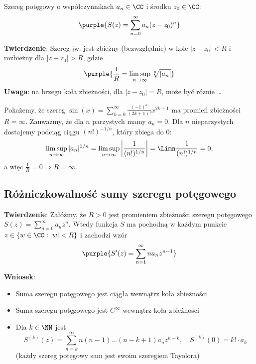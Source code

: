 Szereg potęgowy o współczynnikach $a_n\in\CC$ i środku $z_0\in\CC$:
$$\purple{S(z)=\sum_{n=0}^\infty a_n(z-z_0)^n}$$

\textbf{Twierdzenie}:
Szereg jw. jest zbieżny (bezwzględnie) w kole $|z-z_0|<R$ i rozbieżny dla $|z-z_0|>R$, gdzie
$$\purple{\frac{1}{R}=\limsup_{n\to\infty}\sqrt[n]{|a_n|}}$$
\textbf{Uwaga}: na brzegu koła zbieżności, dla $|z-z_0|=R$, może być różnie \ldots

\begin{example}
    Pokażemy, że szereg $\sin(x)=\sum_{k=0}^\infty\frac{(-1)^k}{(2k+1)!}x^{2k+1}$ ma promień zbieżności $R=\infty$. Zauważmy, że dla $n$ parzystych mamy $a_n=0$. Dla $n$ nieparzystych dostajemy podciąg ciągu $(n!)^{-1/n}$, który zbiega do 0:
    $$
    \limsup_{n\to\infty}|a_n|^{1/n} = \limsup_{n\to\infty}\left|\frac{1}{(n!)^{1/n}}\right| = \Limn\frac{1}{(n!)^{1/n}} = 0,
    $$
    a więc $\frac{1}{R}=0 \Rightarrow R = \infty$.
\end{example}

\subsection{Różniczkowalność sumy szeregu potęgowego}
\textbf{Twierdzenie}:
Załóżmy, że $R>0$ jest promieniem zbieżności szeregu potęgowego $S(z)=\sum_{n=0}^\infty a_nz^n$. Wtedy funkcja $S$ ma pochodną w każdym punkcie $z\in\{w\in\CC:|w|<R\}$ i zachodzi wzór
$$\purple{S'(z)=\sum_{n=1}^\infty na_nz^{n-1}}$$

\textbf{Wniosek}:
\begin{itemize}
    \item Suma szeregu potęgowego jest ciągła wewnątrz koła zbieżności
    \item Suma szeregu potęgowego jest $C^\infty$ wewnątrz koła zbieżności
    \item Dla $k\in\NN$ jest $$S^{(k)}(z)=\sum_{n=k}^\infty n(n-1)\ldots(n-k+1)a_nz^{n-k},\quad S^{(k)}(0) = k!\cdot a_k$$
    (każdy szereg potęgowy sam jest swoim szeregiem Tayolora)
\end{itemize}

